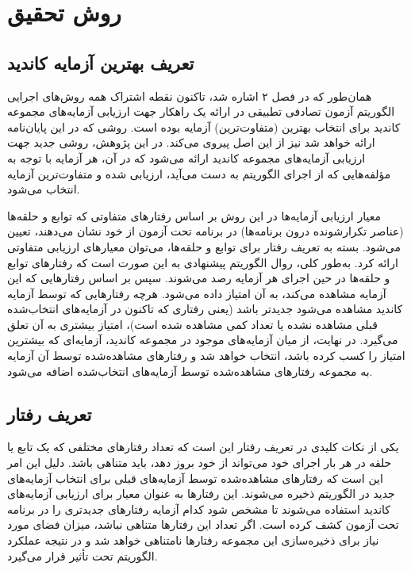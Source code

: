 \chapter{روش تحقیق}\label{chapter3}

\section{تعریف بهترین آزمایه کاندید}

همان‌طور که در فصل ۲ اشاره شد، تاکنون نقطه اشتراک همه روش‌های اجرایی الگوریتم آزمون تصادفی تطبیقی در ارائه یک راهکار جهت ارزیابی آزمایه‌های مجموعه کاندید برای انتخاب بهترین (متفاوت‌ترین) آزمایه بوده است. روشی که در این پایان‌نامه ارائه خواهد شد نیز از این اصل پیروی می‌کند. در این پژوهش، روشی جدید جهت ارزیابی آزمایه‌های مجموعه کاندید ارائه می‌شود که در آن، هر آزمایه با توجه به مؤلفه‌هایی که از اجرای الگوریتم به دست می‌آید، ارزیابی شده و متفاوت‌ترین آزمایه انتخاب می‌شود.

معیار ارزیابی آزمایه‌ها در این روش بر اساس رفتارهای متفاوتی که توابع و حلقه‌ها (عناصر تکرارشونده درون برنامه‌ها) در برنامه تحت آزمون از خود نشان می‌دهند، تعیین می‌شود. بسته به تعریف رفتار برای توابع و حلقه‌ها، می‌توان معیارهای ارزیابی متفاوتی ارائه کرد. به‌طور کلی، روال الگوریتم پیشنهادی به این صورت است که رفتارهای توابع و حلقه‌ها در حین اجرای هر آزمایه رصد می‌شوند. سپس بر اساس رفتارهایی که این آزمایه مشاهده می‌کند، به آن امتیاز داده می‌شود. هرچه رفتارهایی که توسط آزمایه کاندید مشاهده می‌شود جدیدتر باشد (یعنی رفتاری که تاکنون در آزمایه‌های انتخاب‌شده قبلی مشاهده نشده یا تعداد کمی مشاهده شده است)، امتیاز بیشتری به آن تعلق می‌گیرد. در نهایت، از میان آزمایه‌های موجود در مجموعه کاندید، آزمایه‌ای که بیشترین امتیاز را کسب کرده باشد، انتخاب خواهد شد و رفتارهای مشاهده‌شده توسط آن آزمایه به مجموعه رفتارهای مشاهده‌شده توسط آزمایه‌های انتخاب‌شده اضافه می‌شود.

\section{تعریف رفتار}

یکی از نکات کلیدی در تعریف رفتار این است که تعداد رفتارهای مختلفی که یک تابع یا حلقه در هر بار اجرای خود می‌تواند از خود بروز دهد، باید متناهی باشد. دلیل این امر این است که رفتارهای مشاهده‌شده توسط آزمایه‌های قبلی برای انتخاب آزمایه‌های جدید در الگوریتم ذخیره می‌شوند. این رفتارها به عنوان معیار برای ارزیابی آزمایه‌های کاندید استفاده می‌شوند تا مشخص شود کدام آزمایه رفتارهای جدیدتری را در برنامه تحت آزمون کشف کرده است. اگر تعداد این رفتارها متناهی نباشد، میزان فضای مورد نیاز برای ذخیره‌سازی این مجموعه رفتارها نامتناهی خواهد شد و در نتیجه عملکرد الگوریتم تحت تأثیر قرار می‌گیرد.

